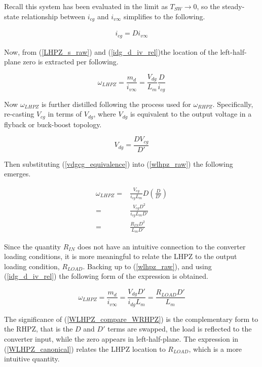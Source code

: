 \documentclass[conference]{IEEEtran}
\begin{document}
Recall this system has been evaluated in the limit as $T_{SW} \to 0$, so the steady-state relationship between $i_{cg}$ and $i_{v\infty}$ simplifies to the following.

\begin{align}
i_{cg} = D i_{v\infty}
\label{idg_d_iv_rel}
\end{align}

Now, from (\ref{LHPZ_s_raw}) and (\ref{idg_d_iv_rel})the location of the left-half-plane zero is extracted per following.

\begin{equation}
\omega_{LHPZ} = \frac{m_d}{i_{v\infty}} = \frac{V_{dg}}{L_m} \frac{D}{i_{cg}}
\label{wlhpz_raw}
\end{equation}

Now $\omega_{LHPZ}$ is further distilled following the process used for $\omega_{RHPZ}$.  Specifically, re-casting $V_{cg}$ in terms of $V_{dg}$, where $V_{dg}$ is equivalent to the output voltage in a flyback or buck-boost topology.

\begin{equation}
V_{dg} = \frac{D V_{cg}} {D'}
\label{vdgcg_equivalence}
\end{equation}

Then substituting (\ref{vdgcg_equivalence}) into (\ref{wlhpz_raw}) the following emerges.

\begin{align}
\omega_{LHPZ} =& \frac{V_{cg}}{ i_{cg} L_m } D (\frac{D}{D'}) \nonumber \\
=&  \frac{V_{cg} D^2}{i_{cg}L_m D' } \nonumber \\
=& \frac{R_{IN} D^2}{L_m D' }
\label{WLHPZ_compare_WRHPZ}
\end{align}

Since the quantity $R_{IN}$ does not have an intuitive connection to the converter loading conditions, it is more meaningful to relate the LHPZ to the output loading condition, $R_{LOAD}$.  Backing up to (\ref{wlhpz_raw}), and using (\ref{idg_d_iv_rel}) the following form of the expression is obtained.

\begin{equation}
	\omega_{LHPZ} = \frac{m_d}{i_{v\infty}} = \frac{V_{dg} D'}{i_{dg} L_m} = \frac{R_{LOAD} D'}{L_m}
	\label{WLHPZ_canonical}
\end{equation}

The significance of (\ref{WLHPZ_compare_WRHPZ}) is the complementary form to the RHPZ, that is the $D$ and $D'$ terms are swapped, the load is reflected to the converter input, while the zero appears in left-half-plane.  The expression in (\ref{WLHPZ_canonical}) relates the LHPZ location to $R_{LOAD}$, which is a more intuitive quantity.
\end{document}
